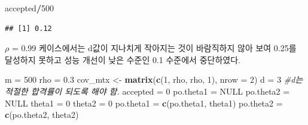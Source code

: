 \documentclass[
]{article}
\newenvironment{Shaded}{\begin{snugshade}}{\end{snugshade}}
\newcommand{\AttributeTok}[1]{\textcolor[rgb]{0.13,0.29,0.53}{#1}}
\newcommand{\CommentTok}[1]{\textcolor[rgb]{0.56,0.35,0.01}{\textit{#1}}}
\newcommand{\ConstantTok}[1]{\textcolor[rgb]{0.56,0.35,0.01}{#1}}
\newcommand{\DecValTok}[1]{\textcolor[rgb]{0.00,0.00,0.81}{#1}}
\newcommand{\FloatTok}[1]{\textcolor[rgb]{0.00,0.00,0.81}{#1}}
\newcommand{\FunctionTok}[1]{\textcolor[rgb]{0.13,0.29,0.53}{\textbf{#1}}}
\newcommand{\NormalTok}[1]{#1}
\newcommand{\OtherTok}[1]{\textcolor[rgb]{0.56,0.35,0.01}{#1}}
\newcommand{\SpecialCharTok}[1]{\textcolor[rgb]{0.81,0.36,0.00}{\textbf{#1}}}
\begin{document}
\begin{Shaded}
\begin{Highlighting}[]
\NormalTok{accepted}\SpecialCharTok{/}\DecValTok{500}
\end{Highlighting}
\end{Shaded}

\begin{verbatim}
## [1] 0.12
\end{verbatim}

\(\rho\) = 0.99 케이스에서는 d값이 지나치게 작아지는 것이 바람직하지
않아 보여 0.25를 달성하지 못하고 성능 개선이 낮은 수준인 0.1 수준에서
중단하였다.

\begin{Shaded}
\begin{Highlighting}[]
\NormalTok{m }\OtherTok{=} \DecValTok{500}
\NormalTok{rho }\OtherTok{=} \FloatTok{0.3}
\NormalTok{cov\_mtx }\OtherTok{\textless{}{-}} \FunctionTok{matrix}\NormalTok{(}\FunctionTok{c}\NormalTok{(}\DecValTok{1}\NormalTok{, rho, rho, }\DecValTok{1}\NormalTok{), }\AttributeTok{nrow =} \DecValTok{2}\NormalTok{)}
\NormalTok{d }\OtherTok{=} \DecValTok{3} \CommentTok{\#d는 적절한 합격률이 되도록 해야 함. }
\NormalTok{accepted }\OtherTok{=} \DecValTok{0}
\NormalTok{po.theta1 }\OtherTok{=} \ConstantTok{NULL}
\NormalTok{po.theta2 }\OtherTok{=} \ConstantTok{NULL}
\NormalTok{theta1 }\OtherTok{=} \DecValTok{0}
\NormalTok{theta2 }\OtherTok{=} \DecValTok{0}
\NormalTok{po.theta1 }\OtherTok{=} \FunctionTok{c}\NormalTok{(po.theta1, theta1)}
\NormalTok{po.theta2 }\OtherTok{=} \FunctionTok{c}\NormalTok{(po.theta2, theta2) }


\end{Highlighting}
\end{Shaded}
\end{document}
